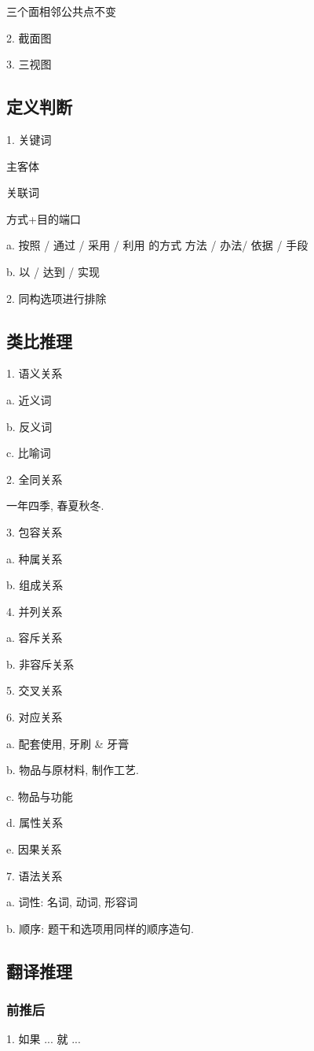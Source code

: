 三个面相邻公共点不变

2. 截面图


3. 三视图

\subsection{定义判断}
1. 关键词

主客体

关联词

方式+目的端口

a. 按照 / 通过 / 采用 / 利用 的方式 方法 / 办法/ 依据 / 手段

b. 以 / 达到 / 实现

2. 同构选项进行排除

\subsection{类比推理}
1. 语义关系

a. 近义词

b. 反义词

c.  比喻词

2. 全同关系

一年四季, 春夏秋冬.

3. 包容关系

a. 种属关系

b. 组成关系

4. 并列关系

a. 容斥关系

b. 非容斥关系

5. 交叉关系

6. 对应关系

a. 配套使用, 牙刷 \& 牙膏

b. 物品与原材料, 制作工艺.

c. 物品与功能

d. 属性关系

e. 因果关系

7. 语法关系

a. 词性: 名词, 动词, 形容词

b. 顺序: 题干和选项用同样的顺序造句.

\subsection{翻译推理}

\subsubsection{前推后}
1. 如果 ... 就 ...

